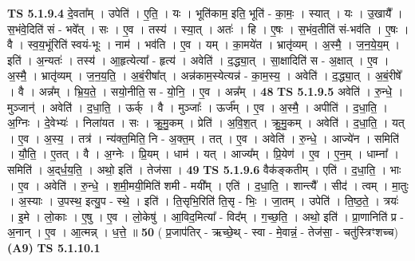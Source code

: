 \documentclass[17pt]{extarticle}
\begin{document}
                  \newline
                                \textbf{ TS 5.1.9.4} \newline
                  दे॒वता᳚म् । उपेति॑ । ए॒ति॒ । यः । भूति॑काम॒ इति॒ भूति॑ - का॒मः॒ । स्यात् । यः । उ॒खायै᳚ । स॒भंवे॒दिति॑ सं - भवे᳚त् । सः । ए॒व । तस्य॑ । स्या॒त् । अतः॑ । हि । ए॒षः । स॒भंव॒तीति॑ सं-भव॑ति । ए॒षः । वै । स्व॒य॒भूंरिति॑ स्वयं-भूः । नाम॑ । भव॑ति । ए॒व । यम् । का॒मये॑त । भ्रातृ॑व्यम् । अ॒स्मै॒ । ज॒न॒ये॒य॒म् । इति॑ । अ॒न्यतः॑ । तस्य॑ । आ॒हृत्येत्या᳚ - हृत्य॑ । अवेति॑ । द॒द्ध्या॒त् । सा॒क्षादिति॑ स - अ॒क्षात् । ए॒व । अ॒स्मै॒ । भ्रातृ॑व्यम् । ज॒न॒य॒ति॒ । अ॒बं॒रीषा᳚त् । अन्न॑काम॒स्येत्यन्न॑ - का॒म॒स्य॒ । अवेति॑ । द॒द्ध्या॒त् । अ॒बं॒रीषे᳚ । वै । अन्न᳚म् । भ्रि॒य॒ते॒ । सयो॒नीति॒ स - यो॒नि॒ । ए॒व । अन्न᳚म् । \textbf{  48} \newline
                  \newline
                                \textbf{ TS 5.1.9.5} \newline
                  अवेति॑ । रु॒न्धे॒ । मुञ्जान्॑ । अवेति॑ । द॒धा॒ति॒ । ऊर्क् । वै । मुञ्जाः᳚ । ऊर्ज᳚म् । ए॒व । अ॒स्मै॒ । अपीति॑ । द॒धा॒ति॒ । अ॒ग्निः । दे॒वेभ्यः॑ । निला॑यत । सः । क्रु॒मु॒कम् । प्रेति॑ । अ॒वि॒श॒त् । क्रु॒मु॒कम् । अवेति॑ । द॒धा॒ति॒ । यत् । ए॒व । अ॒स्य॒ । तत्र॑ । न्य॑क्त॒मिति॒ नि - अ॒क्त॒म् । तत् । ए॒व । अवेति॑ । रु॒न्धे॒ । आज्ये॑न । समिति॑ । यौ॒ति॒ । ए॒तत् । वै । अ॒ग्नेः । प्रि॒यम् । धाम॑ । यत् । आज्य᳚म् । प्रि॒येण॑ । ए॒व । ए॒न॒म् । धाम्ना᳚ । समिति॑ । अ॒द्‌र्ध॒य॒ति॒ । अथो॒ इति॑ । तेज॑सा । \textbf{  49} \newline
                  \newline
                                \textbf{ TS 5.1.9.6} \newline
                  वैक॑ङ्कतीम् । एति॑ । द॒धा॒ति॒ । भाः । ए॒व । अवेति॑ । रु॒न्धे॒ । श॒मी॒मयी॒मिति॑ शमी - मयी᳚म् । एति॑ । द॒धा॒ति॒ । शान्त्यै᳚ । सीद॑ । त्वम् । मा॒तुः । अ॒स्याः । उ॒पस्थ॒ इत्यु॒प - स्थे॒ । इति॑ । ति॒सृभि॒रिति॑ ति॒सृ - भिः॒ । जा॒तम् । उपेति॑ । ति॒ष्ठ॒ते॒ । त्रयः॑ । इ॒मे । लो॒काः । ए॒षु । ए॒व । लो॒केषु॑ । आ॒विद॒मित्या᳚ - विद᳚म् । ग॒च्छ॒ति॒ । अथो॒ इति॑ । प्रा॒णानिति॑ प्र - अ॒नान् । ए॒व । आ॒त्मन्न् । ध॒त्ते॒ ॥ \textbf{  50} \newline
                  \newline
                      ( प्र॒जाप॑तिर् - ऋच्छे॒थ् - स्वा - मे॒वान्नं॒ - तेज॑सा॒ - चतु॑स्त्रिꣳशच्च)  \textbf{(A9)} \newline \newline
                                \textbf{ TS 5.1.10.1} \newline
\end{document}
